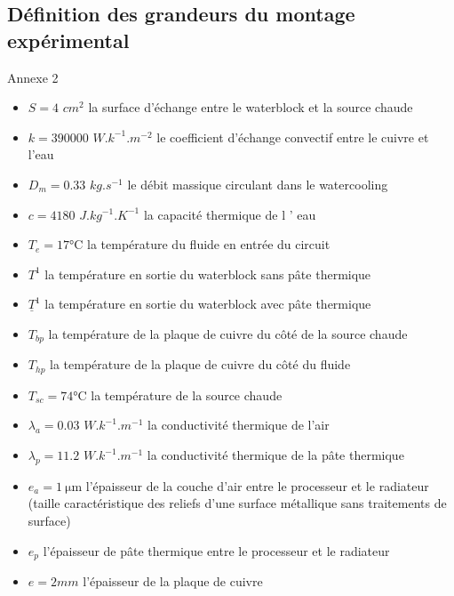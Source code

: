 \documentclass[hyperref={pdfpagelabels=false}]{beamer}
\begin{document}
\subsection*{Définition des grandeurs du montage expérimental}\label{a2}
\begin{frame}{Annexe 2 {\textcolor{ultramarine}{\hyperlink{e12}{}}} }

	\begin{itemize}
	\item $S = 4$ $cm^2$ la surface d'échange entre le waterblock et la source chaude
	\item $k = 390 000$ $W.k^{-1}.m^{-2}$ le coefficient d'échange convectif entre le cuivre et l'eau
	\item $D_m= 0.33$ $kg.s^{-1}$ le débit massique circulant dans le watercooling 
	\item $c = 4180$ $J.kg^{-1}.K^{-1}$ la capacité thermique de l ' eau	
	\item $T_e =17$°C la température du fluide en entrée du circuit 
	\item $T^1$ la température en sortie du waterblock sans pâte thermique
	\item $\underline{T}^1$ la température en sortie du waterblock avec pâte thermique	
	\item $T_{bp}$ la température de la plaque de cuivre du côté de la source chaude 
	\item $T_{hp}$ la température de la plaque de cuivre du côté du fluide 
	\end{itemize}
\end{frame}
\begin{frame}
	\begin{itemize}
	\item $T_{sc} = 74$°C la température de la source chaude
	\item $\lambda_{a}=0.03$ $W.k^{-1}.m^{-1}$ la conductivité thermique de l'air
	\item $\lambda_{p}=11.2$ $W.k^{-1}.m^{-1}$ la conductivité thermique de la pâte thermique
	\item $e_a = \SI{1}{\micro\metre}$ l'épaisseur de la couche d'air entre le processeur et le radiateur (taille caractéristique des reliefs d’une surface métallique sans traitements de surface) 
	\item $e_p$ l'épaisseur de pâte thermique entre le processeur et le radiateur
	\item $e = 2 mm$ l'épaisseur de la plaque de cuivre
	\end{itemize}
\end{frame}
\end{document}
